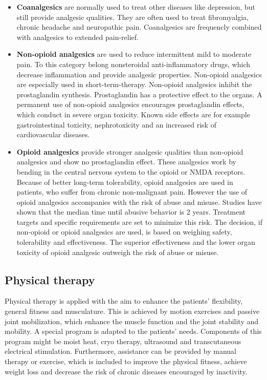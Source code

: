 \begin{itemize}
\item \textbf{Coanalgesics} are normally used to treat other diseases like depression, but still provide analgesic qualities. They are often used to treat fibromyalgia, chronic headache and neuropathic pain. Coanalgesics are frequencly combined with analgesics to extended pain-relief. \cite{marcus2009}

\item \textbf{Non-opioid analgesics} are used to reduce intermittent mild to moderate pain. To this category belong nonsteroidal anti-inflammatory drugs, which decrease inflammation and provide analgesic properties. Non-opioid analgesics are especially used in short-term-therapy. Non-opioid analgesics inhibit the prostaglandin synthesis. Prostaglandin has a protective effect to the organs. A permanent use of non-opioid analgesics encourages prostaglandin effects, which conduct in severe organ toxicity. Known side effects are for example gastrointestinal toxicity, nephrotoxicity and an increased risk of cardiovascular diseases. \cite{marcus2009,stein2007}

\item \textbf{Opioid analgesics} provide stronger analgesic qualities than non-opioid analgesics and show no prostaglandin effect. These analgesics work by bending in the central nervous system to the opioid or NMDA receptors.  Because of better long-term tolerability, opioid analgesics are used in patients, who suffer from chronic non-malignant pain. However the use of opioid analgesics accompanies with the risk of abuse and misuse. Studies have shown that the median time until abusive behavior is 2 years. Treatment targets and specific requirements are set to minimize this risk. \cite{marcus2009,stein2007}
The decision, if non-opioid or opioid analgesics are used, is based on weighing safety, tolerability and effectiveness. The superior effectiveness and the lower organ toxicity of opioid analgesic outweigh the risk of abuse or misuse. \cite{marcus2009} 
\end{itemize}

\subsection{Physical therapy}
Physical therapy is applied with the aim to enhance the patients' flexibility, general fitness and musculature. This is achieved by motion exercises and passive joint mobilization, which enhance the muscle function and the joint stability and mobility. A special program is adapted to the patients' needs. Components of this program might be moist heat, cryo therapy, ultrasound and transcutaneous electrical stimulation. Furthermore, assistance can be provided by manual therapy or exercise, which is included to improve the physical fitness, achieve weight loss and decrease the risk of chronic diseases encouraged by inactivity. \cite{marcus2009,pope2017}

